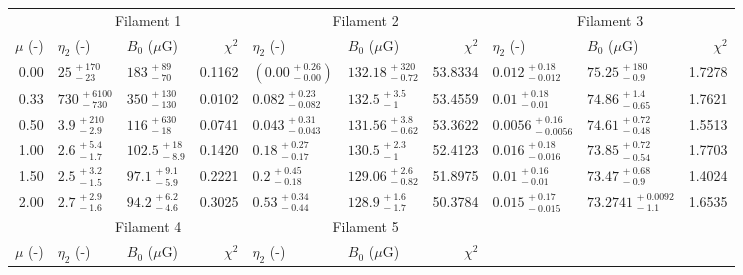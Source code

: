 \begin{tabular}{@{}rllr llr llr @{}}

\toprule
{} & \multicolumn{3}{c}{Filament 1} & \multicolumn{3}{c}{Filament 2} &
     \multicolumn{3}{c}{Filament 3} \\
\cmidrule(lr){2-4}
\cmidrule(lr){5-7}
\cmidrule(lr){8-10}
$\mu$ (-) & $\eta_2$ (-) & $B_0$ ($\mu$G) & $\chi^2$
          & $\eta_2$ (-) & $B_0$ ($\mu$G) & $\chi^2$
          & $\eta_2$ (-) & $B_0$ ($\mu$G) & $\chi^2$ \\

\midrule
0.00 & $25^{\,+170}_{\,-23}$ & ${183}^{\,+89}_{\,-70}$ & 0.1162
     & $\left({0.00}^{\,+0.26}_{\,-0.00}\right)$\tablenotemark{a} & ${132.18}^{\,+320}_{\,-0.72}$ & 53.8334
     & ${0.012}^{\,+0.18}_{\,-0.012}$ & ${75.25}^{\,+180}_{\,-0.9}$ & 1.7278\\[1.5pt]
0.33 & $730^{\,+6100}_{\,-730}$ & $350^{\,+130}_{\,-130}$ & 0.0102
     & ${0.082}^{\,+0.23}_{\,-0.082}$ & ${132.5}^{\,+3.5}_{\,-1}$ & 53.4559
     & ${0.01}^{\,+0.18}_{\,-0.01}$ & ${74.86}^{\,+1.4}_{\,-0.65}$ & 1.7621\\[1.5pt]
0.50 & $3.9^{\,+210}_{\,-2.9}$ & ${116}^{\,+630}_{\,-18}$ & 0.0741
     & ${0.043}^{\,+0.31}_{\,-0.043}$ & ${131.56}^{\,+3.8}_{\,-0.62}$ & 53.3622
     & ${0.0056}^{\,+0.16}_{\,-0.0056}$ & ${74.61}^{\,+0.72}_{\,-0.48}$ & 1.5513\\[1.5pt]
1.00 & ${2.6}^{\,+5.4}_{\,-1.7}$ & ${102.5}^{\,+18}_{\,-8.9}$ & 0.1420
     & ${0.18}^{\,+0.27}_{\,-0.17}$ & ${130.5}^{\,+2.3}_{\,-1}$ & 52.4123
     & ${0.016}^{\,+0.18}_{\,-0.016}$ & ${73.85}^{\,+0.72}_{\,-0.54}$ & 1.7703\\[1.5pt]
1.50 & ${2.5}^{\,+3.2}_{\,-1.5}$ & ${97.1}^{\,+9.1}_{\,-5.9}$ & 0.2221
     & ${0.2}^{\,+0.45}_{\,-0.18}$ & ${129.06}^{\,+2.6}_{\,-0.82}$ & 51.8975
     & ${0.01}^{\,+0.16}_{\,-0.01}$ & ${73.47}^{\,+0.68}_{\,-0.9}$ & 1.4024\\[1.5pt]
2.00 & ${2.7}^{\,+2.9}_{\,-1.6}$ & ${94.2}^{\,+6.2}_{\,-4.6}$ & 0.3025
     & ${0.53}^{\,+0.34}_{\,-0.44}$ & ${128.9}^{\,+1.6}_{\,-1.7}$ & 50.3784
     & ${0.015}^{\,+0.17}_{\,-0.015}$ & ${73.2741}^{\,+0.0092}_{\,-1.1}$ & 1.6535\\

\midrule
{} & \multicolumn{3}{c}{Filament 4} & \multicolumn{3}{c}{Filament 5} \\
\cmidrule(lr){2-4}
\cmidrule(lr){5-7}
$\mu$ (-) & $\eta_2$ (-) & $B_0$ ($\mu$G) & $\chi^2$
          & $\eta_2$ (-) & $B_0$ ($\mu$G) & $\chi^2$ \\


\end{tabular}
